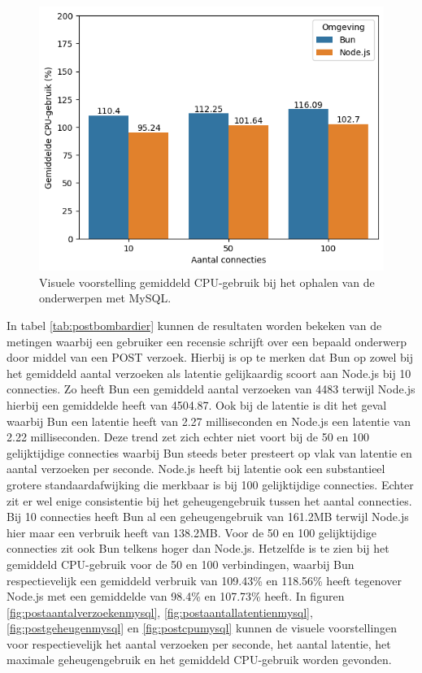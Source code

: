   \begin{figure}[H]
    \centering
    \includegraphics[width=0.7\columnwidth]{graphics/GetMySqlCpu.png}
    \caption[CPU-gebruik GET verzoek met MySQL]{\label{fig:getcpumysql}Visuele voorstelling gemiddeld CPU-gebruik bij het ophalen van de onderwerpen met MySQL.}
  \end{figure}

In tabel \ref{tab:postbombardier} kunnen de resultaten worden bekeken van de metingen waarbij 
een gebruiker een recensie schrijft over een bepaald onderwerp door middel van een POST verzoek.
Hierbij is op te merken dat Bun op zowel bij het gemiddeld aantal verzoeken als latentie gelijkaardig scoort aan Node.js bij 10 connecties. Zo heeft Bun
een gemiddeld aantal verzoeken van 4483 terwijl Node.js hierbij een gemiddelde heeft van 4504.87. 
Ook bij de latentie is dit het geval waarbij Bun een latentie heeft van 2.27 milliseconden en Node.js een latentie van 2.22 milliseconden.
Deze trend zet zich echter niet voort bij de 50 en 100 gelijktijdige connecties waarbij Bun steeds beter presteert op vlak van latentie en aantal verzoeken per seconde.
Node.js heeft bij latentie ook een substantieel grotere standaardafwijking die merkbaar is bij 100 gelijktijdige connecties.
Echter zit er wel enige consistentie bij het geheugengebruik tussen het aantal connecties.
Bij 10 connecties heeft Bun al een geheugengebruik van 161.2MB terwijl Node.js hier maar een verbruik heeft van 138.2MB.
Voor de 50 en 100 gelijktijdige connecties zit ook Bun telkens hoger dan Node.js.
Hetzelfde is te zien bij het gemiddeld CPU-gebruik voor de 50 en 100 verbindingen, waarbij Bun respectievelijk
een gemiddeld verbruik van 109.43\% en 118.56\% heeft tegenover Node.js met een gemiddelde van 98.4\% en 107.73\% heeft.
In figuren \ref{fig:postaantalverzoekenmysql}, \ref{fig:postaantallatentienmysql}, \ref{fig:postgeheugenmysql} en \ref{fig:postcpumysql} kunnen de visuele voorstellingen 
voor respectievelijk het aantal verzoeken per seconde, het aantal latentie, het maximale geheugengebruik en het gemiddeld CPU-gebruik worden gevonden.

